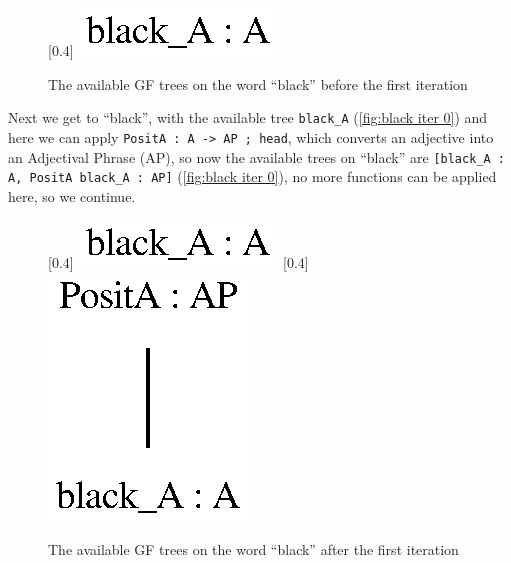 \begin{figure}[H]
    \centering
    [0.4\textwidth]
        {\includegraphics[scale=0.75]{thesis/figure/black_cats/black_A_gf.eps}}
    \caption{The available GF trees on the word ``black'' before the first iteration}\label{fig:black iter 0}
\end{figure}

Next we get to ``black'', with the available tree \lstinline|black_A| (\autoref{fig:black iter 0}) and here we can apply \lstinline|PositA : A -> AP ; head|, which converts an adjective into an Adjectival Phrase (AP), so now the available trees on ``black'' are
\lstinline|[black_A : A, PositA black_A : AP]| (\autoref{fig:black iter 0}), no more functions can be applied here, so we continue.

\begin{figure}[H]
    \centering
    [0.4\textwidth]
        {\includegraphics[scale=0.75]{thesis/figure/black_cats/black_A_gf.eps}}
    [0.4\textwidth]
        {\includegraphics[scale=0.75]{thesis/figure/black_cats/black_AP_gf.eps}}
    \caption{The available GF trees on the word ``black'' after the first iteration}\label{fig:black iter 1}
\end{figure}


